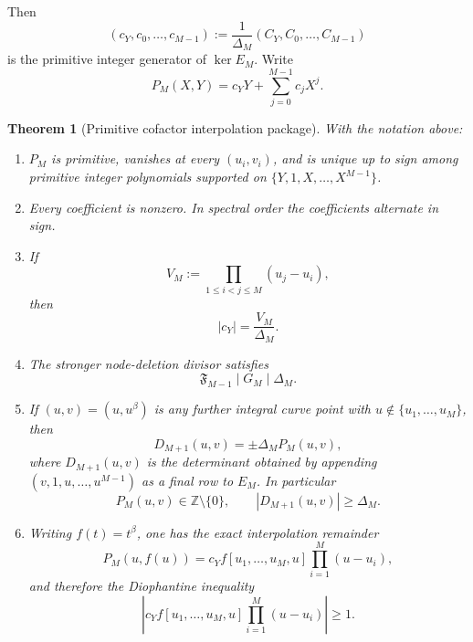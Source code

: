 \documentclass[11pt,oneside]{article}
\newtheorem{theorem}{Theorem}[section]
\theoremstyle{definition}
\theoremstyle{remark}
\newcommand{\Z}{\mathbb Z}
\newcommand{\SF}[1]{\mathfrak F_{#1}}
\begin{document}
Then
\[
 (c_Y,c_0,\ldots,c_{M-1})
 :=\frac1{\Delta_M}(C_Y,C_0,\ldots,C_{M-1})
\]
is the primitive integer generator of $\ker E_M$.  Write
\begin{equation}
 P_M(X,Y)=c_YY+\sum_{j=0}^{M-1}c_jX^j.
 \label{c3:eq-PM}
\end{equation}

\begin{theorem}[Primitive cofactor interpolation package]
\label{c3:thm-smith-package}
With the notation above:
\begin{enumerate}
\item $P_M$ is primitive, vanishes at every $(u_i,v_i)$, and is unique up to sign among
      primitive integer polynomials supported on
      $\{Y,1,X,\ldots,X^{M-1}\}$.
\item Every coefficient is nonzero.  In spectral order the coefficients alternate in sign.
\item If
      \[
       V_M:=\prod_{1\le i<j\le M}(u_j-u_i),
      \]
      then
      \begin{equation}
       |c_Y|=\frac{V_M}{\Delta_M}.
       \label{c3:eq-cY}
      \end{equation}
\item The stronger node-deletion divisor satisfies
      \begin{equation}
       \SF{M-1}\mid G_M\mid\Delta_M.
       \label{c3:eq-F-divides-Delta}
      \end{equation}
\item If $(u,v)=(u,u^\beta)$ is any further integral curve point with
      $u\notin\{u_1,\ldots,u_M\}$, then
      \begin{equation}
       D_{M+1}(u,v)=\pm\Delta_M P_M(u,v),
       \label{c3:eq-augdet-factor}
      \end{equation}
      where $D_{M+1}(u,v)$ is the determinant obtained by appending $(v,1,u,\ldots,u^{M-1})$
      as a final row to $E_M$.  In particular
      \begin{equation}
       P_M(u,v)\in\Z\setminus\{0\},
       \qquad
       |D_{M+1}(u,v)|\ge\Delta_M.
       \label{c3:eq-augdet-lower}
      \end{equation}
\item Writing $f(t)=t^\beta$, one has the exact interpolation remainder
      \begin{equation}
       P_M(u,f(u))
       =c_Y f[u_1,\ldots,u_M,u]
        \prod_{i=1}^{M}(u-u_i),
       \label{c3:eq-primitive-remainder}
      \end{equation}
      and therefore the Diophantine inequality
      \begin{equation}
       \left|c_Y f[u_1,\ldots,u_M,u]
        \prod_{i=1}^{M}(u-u_i)\right|\ge1.
       \label{c3:eq-primitive-ineq}
      \end{equation}
\end{enumerate}
\end{theorem}
\end{document}
